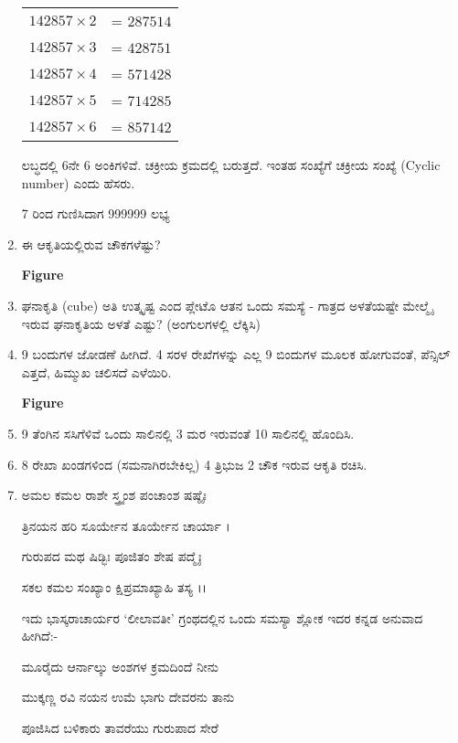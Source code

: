 \begin{enumerate}
\begin{tabular}{ll}
$142857 \times 2$ & = $287514$\\
$142857 \times 3$ & = $428751$\\
$142857 \times 4$ & = $571428$\\
$142857 \times 5$ & = $714285$\\
$142857 \times 6$ & = $857142$
\end{tabular}

ಲಬ್ಧದಲ್ಲಿ 6ನೇ 6 ಅಂಕಿಗಳಿವೆ. ಚಕ್ರೀಯ ಕ್ರಮದಲ್ಲಿ ಬರುತ್ತದೆ. ಇಂತಹ ಸಂಖ್ಯೆಗೆ ಚಕ್ರೀಯ ಸಂಖ್ಯೆ (Cyclic number) ಎಂದು ಹೆಸರು. 

7 ರಿಂದ ಗುಣಿಸಿದಾಗ 999999 ಲಭ್ಯ

\item ಈ ಆಕೃತಿಯಲ್ಲಿರುವ ಚೌಕಗಳೆಷ್ಟು?

\begin{center}
{\bf Figure}
\end{center}
 
\item ಘನಾಕೃತಿ (cube) ಅತಿ ಉತ್ಕೃಷ್ಟ ಎಂದ ಪ್ಲೇಟೊ ಆತನ ಒಂದು ಸಮಸ್ಯೆ - ಗಾತ್ರದ ಅಳತೆಯಷ್ಟೇ ಮೇಲ್ಮೈ ಇರುವ ಘನಾಕೃತಿಯ ಅಳತೆ ಎಷ್ಟು? (ಅಂಗುಲಗಳಲ್ಲಿ ಲೆಕ್ಕಿಸಿ)

\item 9 ಬಂದುಗಳ ಜೋಡಣೆ ಹೀಗಿದೆ. 4 ಸರಳ ರೇಖೆಗಳನ್ನು ಎಲ್ಲ 9 ಬಿಂದುಗಳ ಮೂಲಕ ಹೋಗುವಂತೆ, ಪೆನ್ಸಿಲ್ ಎತ್ತದೆ, ಹಿಮ್ಮುಖ ಚಲಿಸದೆ ಎಳೆಯಿರಿ. 

\begin{center}
{\bf Figure}
\end{center}
 
 \item 9 ತೆಂಗಿನ ಸಸಿಗೆಳಿವೆ ಒಂದು ಸಾಲಿನಲ್ಲಿ 3 ಮರ ಇರುವಂತೆ 10 ಸಾಲಿನಲ್ಲಿ ಹೊಂದಿಸಿ.
 
 \item 8 ರೇಖಾ ಖಂಡಗಳಿಂದ (ಸಮನಾಗಿರಬೇಕಿಲ್ಲ) 4 ತ್ರಿಭುಜ 2 ಚೌಕ ಇರುವ ಆಕೃತಿ ರಚಿಸಿ. 
 
 \item ಅಮಲ ಕಮಲ ರಾಶೇ ಸ್ತ್ರ್ಯಂಶ ಪಂಚಾಂಶ ಷಷ್ಠೈಃ 
 
 ತ್ರಿನಯನ ಹರಿ ಸೂರ್ಯೇನ ತೂರ್ಯೇನ ಚಾರ್ಯಾ ।
 
 ಗುರುಪದ ಮಥ ಷಿಡ್ಭಿಃ ಪೂಜಿತಂ ಶೇಷ ಪದ್ಮೈಃ 
 
 ಸಕಲ ಕಮಲ ಸಂಖ್ಯಾಂ ಕ್ಷಿಪ್ರಮಾಖ್ಯಾಹಿ ತಸ್ಯ ।।
 
 \smallskip
 ಇದು ಭಾಸ್ಕರಾಚಾರ್ಯರ ‘ಲೀಲಾವತೀ’ ಗ್ರಂಥದಲ್ಲಿನ ಒಂದು ಸಮಸ್ಯಾ ಶ್ಲೋಕ ಇದರ ಕನ್ನಡ ಅನುವಾದ ಹೀಗಿದೆ:-
 
 ಮೂರೈದು ಆರ್ನಾಲ್ಕು ಅಂಶಗಳ ಕ್ರಮದಿಂದೆ ನೀನು
 
 ಮುಕ್ಕಣ್ಣ ರವಿ ನಯನ ಉಮೆ ಭಾಗು ದೇವರನು ತಾನು 
 
 ಪೂಜಿಸಿದ ಬಳಿಕಾರು ತಾವರೆಯು ಗುರುಪಾದ ಸೇರೆ 
 

\end{enumerate}
